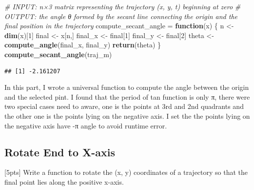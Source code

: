 \documentclass[]{article}
\newenvironment{Shaded}{\begin{snugshade}}{\end{snugshade}}
\newcommand{\CommentTok}[1]{\textcolor[rgb]{0.56,0.35,0.01}{\textit{#1}}}
\newcommand{\ControlFlowTok}[1]{\textcolor[rgb]{0.13,0.29,0.53}{\textbf{#1}}}
\newcommand{\DecValTok}[1]{\textcolor[rgb]{0.00,0.00,0.81}{#1}}
\newcommand{\KeywordTok}[1]{\textcolor[rgb]{0.13,0.29,0.53}{\textbf{#1}}}
\newcommand{\NormalTok}[1]{#1}
\newcommand{\StringTok}[1]{\textcolor[rgb]{0.31,0.60,0.02}{#1}}
\begin{document}
\begin{Shaded}
\begin{Highlighting}[]
\CommentTok{# INPUT: n×3 matrix representing the trajectory (x, y, t) beginning at zero}
\CommentTok{# OUTPUT: the angle θ formed by the secant line connecting the origin and the final position in the trajectory}
\NormalTok{compute_secant_angle =}\StringTok{ }\ControlFlowTok{function}\NormalTok{(x) \{}
\NormalTok{  n <-}\StringTok{ }\KeywordTok{dim}\NormalTok{(x)[}\DecValTok{1}\NormalTok{]}
\NormalTok{  final <-}\StringTok{ }\NormalTok{x[n,]}
\NormalTok{  final_x <-}\StringTok{ }\NormalTok{final[}\DecValTok{1}\NormalTok{]}
\NormalTok{  final_y <-}\StringTok{ }\NormalTok{final[}\DecValTok{2}\NormalTok{]}
\NormalTok{  theta <-}\StringTok{ }\KeywordTok{compute_angle}\NormalTok{(final_x, final_y)}
  \KeywordTok{return}\NormalTok{(theta)}
\NormalTok{\}}
\KeywordTok{compute_secant_angle}\NormalTok{(traj_m)}
\end{Highlighting}
\end{Shaded}

\begin{verbatim}
## [1] -2.161207
\end{verbatim}

In this part, I wrote a universal function to compute the angle between
the origin and the selected pint. I found that the period of tan
function is only π, there were two special cases need to aware, one is
the points at 3rd and 2nd quadrants and the other one is the points
lying on the negative axis. I set the the points lying on the negative
axis have -π angle to avoid runtime error.

\hypertarget{rotate-end-to-x-axis}{%
\subsection{Rotate End to X-axis}\label{rotate-end-to-x-axis}}

{[}5pts{]} Write a function to rotate the (x, y) coordinates of a
trajectory so that the final point lies along the positive x-axis.
\end{document}
